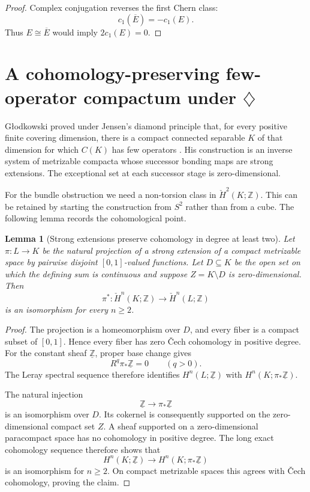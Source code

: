 \documentclass[11pt]{article}
\newtheorem{lemma}[theorem]{Lemma}
\theoremstyle{definition}
\theoremstyle{remark}
\newcommand{\Z}{\mathbb Z}
\newcommand{\Hcheck}{\check H}
\begin{document}
\begin{proof}
Complex conjugation reverses the first Chern class:
\[
       c_1(\overline E)=-c_1(E).
\]
Thus $E\cong\overline E$ would imply $2c_1(E)=0$.
\end{proof}

\section{A cohomology-preserving few-operator compactum under $\diamondsuit$}

G\l odkowski proved under Jensen's diamond principle that, for every positive finite covering dimension, there is a compact connected separable $K$ of that dimension for which $C(K)$ has few operators \cite{Glodkowski}. His construction is an inverse system of metrizable compacta whose successor bonding maps are strong extensions. The exceptional set at each successor stage is zero-dimensional.

For the bundle obstruction we need a non-torsion class in $\Hcheck^2(K;\Z)$. This can be retained by starting the construction from $S^2$ rather than from a cube. The following lemma records the cohomological point.

\begin{lemma}[Strong extensions preserve cohomology in degree at least two]\label{lem:cohomology-strong-extension}
Let $\pi:L\to K$ be the natural projection of a strong extension of a compact metrizable space by pairwise disjoint $[0,1]$-valued functions. Let $D\subseteq K$ be the open set on which the defining sum is continuous and suppose $Z=K\setminus D$ is zero-dimensional. Then
\[
       \pi^*:\Hcheck^n(K;\Z)\longrightarrow\Hcheck^n(L;\Z)
\]
is an isomorphism for every $n\ge2$.
\end{lemma}

\begin{proof}
The projection is a homeomorphism over $D$, and every fiber is a compact subset of $[0,1]$. Hence every fiber has zero \v Cech cohomology in positive degree. For the constant sheaf $\underline{\Z}$, proper base change \cite{Bredon,Iversen} gives
\[
       R^q\pi_*\underline{\Z}=0\qquad(q>0).
\]
The Leray spectral sequence therefore identifies $H^n(L;\underline{\Z})$ with $H^n(K;\pi_*\underline{\Z})$.

The natural injection
\[
       \underline{\Z}\longrightarrow\pi_*\underline{\Z}
\]
is an isomorphism over $D$. Its cokernel is consequently supported on the zero-dimensional compact set $Z$. A sheaf supported on a zero-dimensional paracompact space has no cohomology in positive degree. The long exact cohomology sequence therefore shows that
\[
       H^n(K;\underline{\Z})\longrightarrow H^n(K;\pi_*\underline{\Z})
\]
is an isomorphism for $n\ge2$. On compact metrizable spaces this agrees with \v Cech cohomology, proving the claim.
\end{proof}
\end{document}
